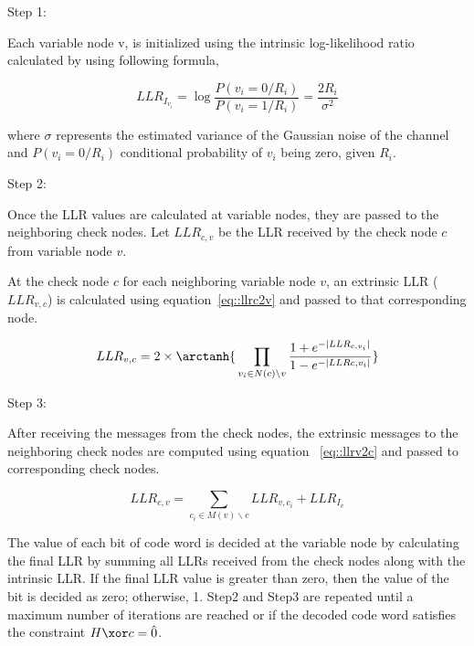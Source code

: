 Step 1:

Each variable node v, is initialized using the intrinsic log-likelihood ratio  calculated by using following formula, 

\begin{equation}
    LLR_{I_{v_i}} = \log \frac{P(v_i=0/R_i)}{P(v_i=1/R_i)} = \frac{2R_i}{\sigma^2} 
\end{equation}


where $\sigma$ represents the estimated variance of the Gaussian noise of the channel and $P(v_i=0/R_i)$ conditional probability of $v_i$ being zero, given $R_i$.

Step 2:

Once the LLR values are calculated at variable nodes, they are passed to the neighboring check nodes. Let $LLR_{c,v}$ be the LLR received by the check node $c$ from variable node $v$.

At the check node $c$ for each neighboring variable node $v$, an extrinsic LLR ($LLR_{v,c}$) is calculated  using equation~\ref{eq::llrc2v} and passed to that corresponding node.

\begin{equation}
    \label{eq::llrc2v}
    LLR_{v,c} = 2 \times \arctanh\{   \\ \prod_{v_{i} \in N(c)\backslash v}  \frac{1+e^{-|LLR_{c,v_{i}}|}}{1-e^{-|LLR{c,v_{i}}|}}\}
\end{equation}

Step 3:

After receiving the messages from the check nodes, the extrinsic messages to the neighboring check nodes are computed using equation ~\ref{eq::llrv2c} and passed to corresponding check nodes.

\begin{equation}
    \label{eq::llrv2c}
    LLR_{c,v} = \sum_{c_{i} \in M(v)\backslash c} LLR_{v,c{_i}} + LLR_{I_{v}}
\end{equation}

The value of each bit of code word is decided at the variable node by calculating the final LLR by summing all LLRs received from the check nodes along with the intrinsic LLR. If the final LLR value is greater than zero, then the value of the bit is decided as zero; otherwise, 1. Step2 and Step3 are repeated until a maximum number of iterations are reached or if the decoded code word satisfies the constraint $H \xor c =\hat{0}$.

